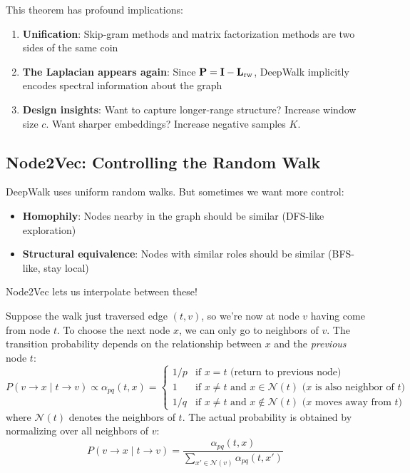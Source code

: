 \begin{notechapter}
\begin{keyinsight}
This theorem has profound implications:

\begin{enumerate}
    \item \textbf{Unification}: Skip-gram methods and matrix factorization methods are two sides of the same coin
    \item \textbf{The Laplacian appears again}: Since $\mathbf{P} = \mathbf{I} - \mathbf{L}_{\text{rw}}$, DeepWalk implicitly encodes spectral information about the graph
    \item \textbf{Design insights}: Want to capture longer-range structure? Increase window size $c$. Want sharper embeddings? Increase negative samples $K$.
\end{enumerate}
\end{keyinsight}

\subsection{Node2Vec: Controlling the Random Walk}

\begin{whybox}
DeepWalk uses uniform random walks. But sometimes we want more control:
\begin{itemize}
    \item \textbf{Homophily}: Nodes nearby in the graph should be similar (DFS-like exploration)
    \item \textbf{Structural equivalence}: Nodes with similar roles should be similar (BFS-like, stay local)
\end{itemize}
Node2Vec lets us interpolate between these!
\end{whybox}

\begin{definition}
Suppose the walk just traversed edge $(t, v)$, so we're now at node $v$ having come from node $t$. To choose the next node $x$, we can only go to neighbors of $v$. The transition probability depends on the relationship between $x$ and the \emph{previous} node $t$:
\[
P(v \to x \mid t \to v) \propto \alpha_{pq}(t, x) = \begin{cases}
    1/p & \text{if } x = t \text{ (return to previous node)} \\
    1 & \text{if } x \neq t \text{ and } x \in \mathcal{N}(t) \text{ (}x\text{ is also neighbor of }t\text{)} \\
    1/q & \text{if } x \neq t \text{ and } x \notin \mathcal{N}(t) \text{ (}x\text{ moves away from }t\text{)}
\end{cases}
\]
where $\mathcal{N}(t)$ denotes the neighbors of $t$. The actual probability is obtained by normalizing over all neighbors of $v$:
\[
P(v \to x \mid t \to v) = \frac{\alpha_{pq}(t,x)}{\sum_{x' \in \mathcal{N}(v)} \alpha_{pq}(t, x')}
\]
\end{definition}


\end{notechapter}
